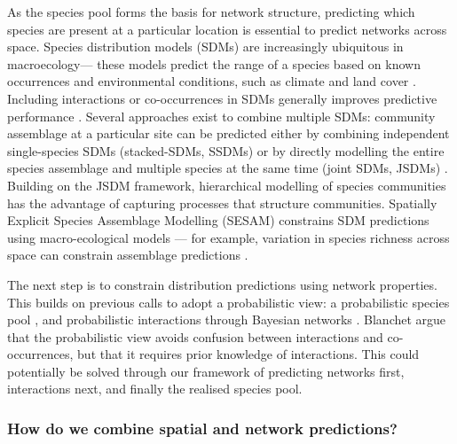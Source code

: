 As the species pool forms the basis for network structure, predicting
which species are present at a particular location is essential to
predict networks across space. Species distribution models (SDMs) are
increasingly ubiquitous in macroecology--- these models predict the
range of a species based on known occurrences and environmental
conditions, such as climate and land cover \cite{Guisan2005PreSpe,
Elith2006NovMet}. Including interactions or co-occurrences in SDMs
generally improves predictive performance \cite{Wisz2013RolBio}. Several
approaches exist to combine multiple SDMs: community assemblage at a
particular site can be predicted either by combining independent
single-species SDMs (stacked-SDMs, SSDMs) or by directly modelling the
entire species assemblage and multiple species at the same time (joint
SDMs, JSDMs) \cite{Norberg2019ComEva}. Building on the JSDM framework,
hierarchical modelling of species communities
\cite{Ovaskainen2017HowMak} has the advantage of capturing processes
that structure communities. Spatially Explicit Species Assemblage
Modelling (SESAM) constrains SDM predictions using macro-ecological
models \cite{Guisan2011SesNew} --- for example, variation in species
richness across space can constrain assemblage predictions
\cite{DAmen2015UsiSpe}.

The next step is to constrain distribution predictions using network
properties. This builds on previous calls to adopt a probabilistic view:
a probabilistic species pool \cite{Karger2016DelPro}, and probabilistic
interactions through Bayesian networks \cite{Staniczenko2017LinMac}.
Blanchet \cite{Blanchet2020CooNot} argue that the probabilistic view avoids confusion
between interactions and co-occurrences, but that it requires prior
knowledge of interactions. This could potentially be solved through our
framework of predicting networks first, interactions next, and finally
the realised species pool.

\subsubsection{How do we combine spatial and network
predictions?}\label{how-do-we-combine-spatial-and-network-predictions}

